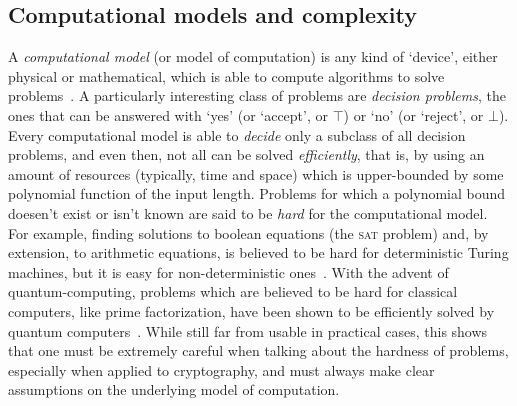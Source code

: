 \subsection{Computational models and complexity}
A \emph{computational model} (or model of computation) is any kind of `device', either physical or
mathematical, which is able to compute algorithms to solve problems~\cite{Savage1997}.
A particularly interesting class of problems are \emph{decision problems}, the ones that can be
answered with `yes' (or `accept', or \(\top \)) or `no' (or `reject', or \(\bot \)).
Every computational model is able to \emph{decide} only a subclass of all decision problems, and
even then, not all can be solved \emph{efficiently}, that is, by using an amount of resources
(typically, time and space) which is upper-bounded by some polynomial function of the input length.
Problems for which a polynomial bound doesen’t exist or isn’t known are said to be \emph{hard} for 
the computational model. 
For example, finding solutions to boolean equations (the \textsc{sat} problem) and, by extension, 
to arithmetic equations, is believed to be hard for deterministic Turing machines, but it is easy 
for non-deterministic ones~\cite{Cook1971}. 
With the advent of quantum-computing, problems which are believed to be hard for
classical computers, like prime factorization, have been shown to be efficiently
solved by quantum computers~\cite{Shor1994}. While still far from usable in practical cases,
this shows that one must be extremely careful when talking about the hardness
of problems, especially when applied to cryptography, and must always make
clear assumptions on the underlying model of computation.
